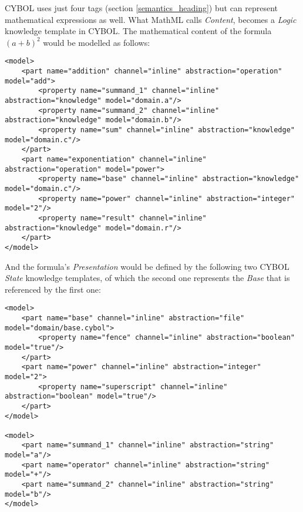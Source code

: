 CYBOL uses just four tags (section \ref{semantics_heading}) but can represent
mathematical expressions as well. What MathML calls \emph{Content}, becomes a
\emph{Logic} knowledge template in CYBOL. The mathematical content of the
formula $(a + b)^{2}$ would be modelled as follows:

\begin{scriptsize}
    \begin{verbatim}
<model>
    <part name="addition" channel="inline" abstraction="operation" model="add">
        <property name="summand_1" channel="inline" abstraction="knowledge" model="domain.a"/>
        <property name="summand_2" channel="inline" abstraction="knowledge" model="domain.b"/>
        <property name="sum" channel="inline" abstraction="knowledge" model="domain.c"/>
    </part>
    <part name="exponentiation" channel="inline" abstraction="operation" model="power">
        <property name="base" channel="inline" abstraction="knowledge" model="domain.c"/>
        <property name="power" channel="inline" abstraction="integer" model="2"/>
        <property name="result" channel="inline" abstraction="knowledge" model="domain.r"/>
    </part>
</model>
    \end{verbatim}
\end{scriptsize}

And the formula's \emph{Presentation} would be defined by the following two
CYBOL \emph{State} knowledge templates, of which the second one represents the
\emph{Base} that is referenced by the first one:

\begin{scriptsize}
    \begin{verbatim}
<model>
    <part name="base" channel="inline" abstraction="file" model="domain/base.cybol">
        <property name="fence" channel="inline" abstraction="boolean" model="true"/>
    </part>
    <part name="power" channel="inline" abstraction="integer" model="2">
        <property name="superscript" channel="inline" abstraction="boolean" model="true"/>
    </part>
</model>

<model>
    <part name="summand_1" channel="inline" abstraction="string" model="a"/>
    <part name="operator" channel="inline" abstraction="string" model="+"/>
    <part name="summand_2" channel="inline" abstraction="string" model="b"/>
</model>
    \end{verbatim}
\end{scriptsize}
